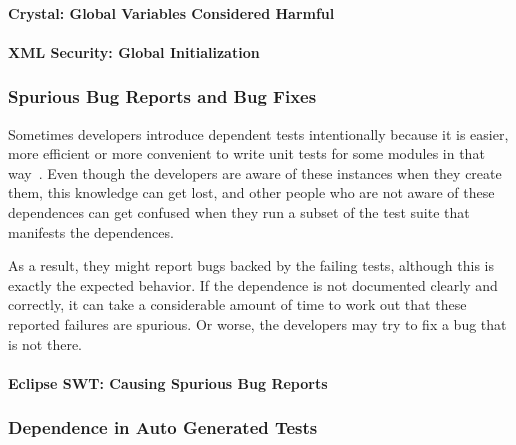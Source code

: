 \paragraph{Crystal: Global Variables Considered Harmful}


\paragraph{XML Security: Global Initialization}



\subsubsection{Spurious Bug Reports and Bug Fixes}\label{sec:spurious}
Sometimes developers introduce dependent tests intentionally because it is
easier, more efficient or more convenient to write unit tests for some modules
in that way~\cite{kapfhammeretal:FSE:2003, whittakeretal:2012}.
Even though the developers are aware of these instances
when they create them, this knowledge can get lost, 
and other people who are not aware of these dependences can get confused 
when they run a subset of the test suite that manifests the
dependences.

As a result, they
might report bugs backed by the failing tests, although this is exactly the expected
behavior. If the dependence is not documented clearly and
correctly, it can take a considerable amount of time to work out that
these reported failures are spurious. Or worse, the developers may try
to fix a bug that is not there.

\paragraph{Eclipse SWT: Causing Spurious Bug Reports}


\subsubsection{Dependence in Auto Generated Tests}
\label{sec:autogen}



